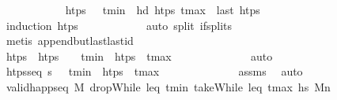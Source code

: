 \begin{isabellebody}
\ \ \ \ \ \ \ \ \ \ \isamarkupfalse%
\ {\isacartoucheopen}htps\ {\isasymnoteq}\ {\isacharbrackleft}{\kern0pt}{\isacharbrackright}{\kern0pt}{\isacartoucheclose}\ {\isacartoucheopen}t\isactrlsub m\isactrlsub i\isactrlsub n\ {\isacharequal}{\kern0pt}\ hd\ htps{\isacartoucheclose}\ {\isacartoucheopen}t\isactrlsub m\isactrlsub a\isactrlsub x\ {\isacharequal}{\kern0pt}\ last\ htps{\isacartoucheclose}\isanewline
\ \ \ \ \ \ \ \ \ \ \isamarkupfalse%
\ {\isacharparenleft}{\kern0pt}induction\ htps{\isacharparenright}{\kern0pt}\isanewline
\ \ \ \ \ \ \ \ \ \ \isamarkupfalse%
\ {\isacharparenleft}{\kern0pt}auto\ split{\isacharcolon}{\kern0pt}\ if{\isacharunderscore}{\kern0pt}splits{\isacharparenright}{\kern0pt}\isanewline
\ \ \ \ \ \ \ \ \ \ \isamarkupfalse%
\ {\isacharparenleft}{\kern0pt}metis\ append{\isacharunderscore}{\kern0pt}butlast{\isacharunderscore}{\kern0pt}last{\isacharunderscore}{\kern0pt}id{\isacharparenright}{\kern0pt}\isanewline
\ \ \ \ \ \ \ \ \ \ \isamarkupfalse%
\isanewline
\ \ \ \ \ \ \ \ \isamarkupfalse%
\ \isamarkupfalse%
\ htps{\isacharprime}{\kern0pt}\ \ {\isachardoublequoteopen}htps\ {\isacharequal}{\kern0pt}\ {\isacharbrackleft}{\kern0pt}{\isacharbrackright}{\kern0pt}\ {\isacharat}{\kern0pt}\ t\isactrlsub m\isactrlsub i\isactrlsub n\ {\isacharhash}{\kern0pt}\ htps{\isacharprime}{\kern0pt}\ {\isacharat}{\kern0pt}\ t\isactrlsub m\isactrlsub a\isactrlsub x\ {\isacharhash}{\kern0pt}\ {\isacharbrackleft}{\kern0pt}{\isacharbrackright}{\kern0pt}{\isachardoublequoteclose}\isanewline
\ \ \ \ \ \ \ \ \ \ \isamarkupfalse%
\ auto\isanewline
\ \ \ \ \ \ \ \ \isamarkupfalse%
\ \isamarkupfalse%
\ {\isachardoublequoteopen}htps{\isacharunderscore}{\kern0pt}seq\ {\isasympi}s\ {\isacharparenleft}{\kern0pt}{\isacharbrackleft}{\kern0pt}{\isacharbrackright}{\kern0pt}\ {\isacharat}{\kern0pt}\ t\isactrlsub m\isactrlsub i\isactrlsub n\ {\isacharhash}{\kern0pt}\ htps{\isacharprime}{\kern0pt}\ {\isacharat}{\kern0pt}\ t\isactrlsub m\isactrlsub a\isactrlsub x\ {\isacharhash}{\kern0pt}\ {\isacharbrackleft}{\kern0pt}{\isacharbrackright}{\kern0pt}{\isacharparenright}{\kern0pt}{\isachardoublequoteclose}\isanewline
\ \ \ \ \ \ \ \ \ \ \isamarkupfalse%
\ assms\ \isamarkupfalse%
\ auto\isanewline
\ \ \ \ \ \ \ \ \isamarkupfalse%
\ \isamarkupfalse%
\ {\isachardoublequoteopen}valid{\isacharunderscore}{\kern0pt}happ{\isacharunderscore}{\kern0pt}seq\ M\ {\isacharparenleft}{\kern0pt}dropWhile\ {\isacharparenleft}{\kern0pt}leq\ t\isactrlsub m\isactrlsub i\isactrlsub n{\isacharparenright}{\kern0pt}\ {\isacharparenleft}{\kern0pt}takeWhile\ {\isacharparenleft}{\kern0pt}leq\ t\isactrlsub m\isactrlsub a\isactrlsub x{\isacharparenright}{\kern0pt}\ hs{\isacharparenright}{\kern0pt}{\isacharparenright}{\kern0pt}\ M\isactrlsub n{\isachardoublequoteclose}\isanewline

\end{isabellebody}
